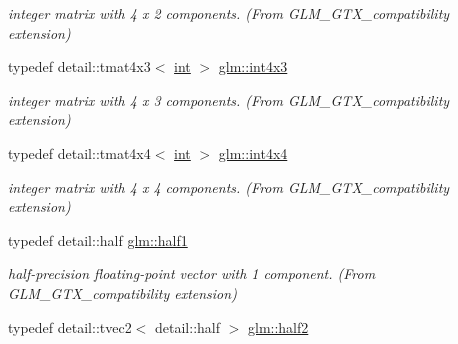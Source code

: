 \begin{DoxyCompactItemize}
\begin{DoxyCompactList}\small\item\em integer matrix with 4 x 2 components. (From G\+L\+M\+\_\+\+G\+T\+X\+\_\+compatibility extension) \end{DoxyCompactList}\item 
\hypertarget{group__gtx__compatibility_ga3aec2463ca19136957081b50fb08c0dc}{}typedef detail\+::tmat4x3$<$ \hyperlink{_s_d_l__thread_8h_a6a64f9be4433e4de6e2f2f548cf3c08e}{int} $>$ \hyperlink{group__gtx__compatibility_ga3aec2463ca19136957081b50fb08c0dc}{glm\+::int4x3}\label{group__gtx__compatibility_ga3aec2463ca19136957081b50fb08c0dc}

\begin{DoxyCompactList}\small\item\em integer matrix with 4 x 3 components. (From G\+L\+M\+\_\+\+G\+T\+X\+\_\+compatibility extension) \end{DoxyCompactList}\item 
\hypertarget{group__gtx__compatibility_ga28bee21ca980ef47b6487c8458a25663}{}typedef detail\+::tmat4x4$<$ \hyperlink{_s_d_l__thread_8h_a6a64f9be4433e4de6e2f2f548cf3c08e}{int} $>$ \hyperlink{group__gtx__compatibility_ga28bee21ca980ef47b6487c8458a25663}{glm\+::int4x4}\label{group__gtx__compatibility_ga28bee21ca980ef47b6487c8458a25663}

\begin{DoxyCompactList}\small\item\em integer matrix with 4 x 4 components. (From G\+L\+M\+\_\+\+G\+T\+X\+\_\+compatibility extension) \end{DoxyCompactList}\item 
\hypertarget{group__gtx__compatibility_ga71881db0a4c69f3d72cc829cd8dc87fa}{}typedef detail\+::half \hyperlink{group__gtx__compatibility_ga71881db0a4c69f3d72cc829cd8dc87fa}{glm\+::half1}\label{group__gtx__compatibility_ga71881db0a4c69f3d72cc829cd8dc87fa}

\begin{DoxyCompactList}\small\item\em half-\/precision floating-\/point vector with 1 component. (From G\+L\+M\+\_\+\+G\+T\+X\+\_\+compatibility extension) \end{DoxyCompactList}\item 
\hypertarget{group__gtx__compatibility_ga9074cacee8be9653063ab23821740426}{}typedef detail\+::tvec2$<$ detail\+::half $>$ \hyperlink{group__gtx__compatibility_ga9074cacee8be9653063ab23821740426}{glm\+::half2}\label{group__gtx__compatibility_ga9074cacee8be9653063ab23821740426}


\end{DoxyCompactItemize}
